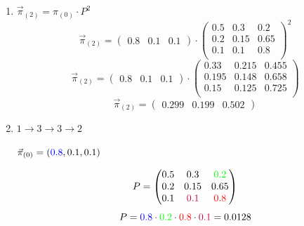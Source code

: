 \documentclass{templateNote}
\begin{document}
\begin{enumerate}[label=\alph*)]
    \item $\vec{\pi}_{(2)}= \pi_{(0)} \cdot P^2 $
    \begin{equation*}
        \vec{\pi}_{(2)}= 
            \begin{pmatrix}
                0.8 & 0.1 & 0.1
            \end{pmatrix} 
            \cdot
            \begin{pmatrix}
                0.5 & 0.3   & 0.2 \\
                0.2 & 0.15  & 0.65 \\
                0.1 & 0.1   & 0.8 \\
            \end{pmatrix}^{2} 
    \end{equation*}
    \begin{equation*}
        \vec{\pi}_{(2)}= 
            \begin{pmatrix}
                0.8 & 0.1 & 0.1
            \end{pmatrix} 
            \cdot
            \begin{pmatrix}
               0.33 & 0.215 & 0.455 \\
               0.195 & 0.148 & 0.658 \\
               0.15 & 0.125 & 0.725 \\
            \end{pmatrix}
    \end{equation*}
    \begin{equation*}
        \vec{\pi}_{(2)}= 
            \begin{pmatrix}
                0.299 & 0.199 & 0.502
            \end{pmatrix}
    \end{equation*}

    \item $1\rightarrow3\rightarrow3\rightarrow2$
    \begin{center}
        $\vec{\pi}_{(0)} = (\textcolor{blue}{0.8},0.1,0.1)$
    \end{center}
    \[
    P = \begin{pmatrix}
        0.5 & 0.3   & \textcolor{green}{0.2} \\
        0.2 & 0.15  & 0.65 \\
        0.1 & \textcolor{purple}{0.1}  & \textcolor{red}{0.8}  \\
    \end{pmatrix}
    \]
    \begin{equation*}
        P= \textcolor{blue}{0.8} \cdot \textcolor{green}{0.2} \cdot \textcolor{red}{0.8} \cdot \textcolor{purple}{0.1} = 0.0128
    \end{equation*}
\end{enumerate}
\end{document}
